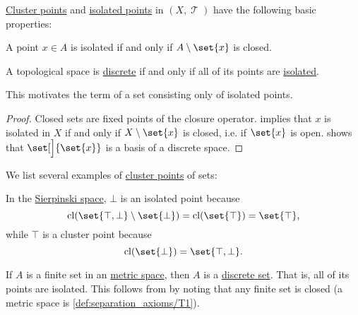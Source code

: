 \begin{proposition}\label{thm:def:set_cluster_point}
  \hyperref[def:set_cluster_point]{Cluster points} and \hyperref[def:set_cluster_point]{isolated points} in \( (X, \mscrT) \) have the following basic properties:
  \begin{thmenum}
     A point \( x \in A \) is isolated if and only if \( A \setminus \set{ x } \) is closed.

     A topological space is \hyperref[def:discrete_topology]{discrete} if and only if all of its points are \hyperref[def:set_cluster_point]{isolated}.

    This motivates the term  of a set consisting only of isolated points.
  \end{thmenum}
\end{proposition}
\begin{proof}
   Closed sets are fixed points of the closure operator.
    implies that \( x \) is isolated in \( X \) if and only if \( X \setminus \set{ x } \) is closed, i.e. if \( \set{ x } \) is open.  shows that \( \set[\Big]{ \set{ x } } \) is a basis of a discrete space.
\end{proof}

\begin{example}\label{ex:def:set_cluster_point}
  We list several examples of \hyperref[def:set_cluster_point]{cluster points} of sets:
  \begin{thmenum}
     In the \hyperref[def:sierpinski_space]{Sierpinski space}, \( \bot \) is an isolated point because
    \begin{equation*}
      \cl(\set{ \top, \bot } \setminus \set{ \bot }) = \cl(\set{ \top }) = \set{ \top },
    \end{equation*}
    while \( \top \) is a cluster point because
    \begin{equation*}
      \cl(\set{ \bot }) = \set{ \top, \bot }.
    \end{equation*}

     If \( A \) is a finite set in an \hyperref[def:metric_space]{metric space}, then \( A \) is a \hyperref[thm:def:set_cluster_point/discrete]{discrete set}. That is, all of its points are isolated. This follows from  by noting that any finite set is closed (a metric space is \ref{def:separation_axioms/T1}).
  \end{thmenum}
\end{example}

